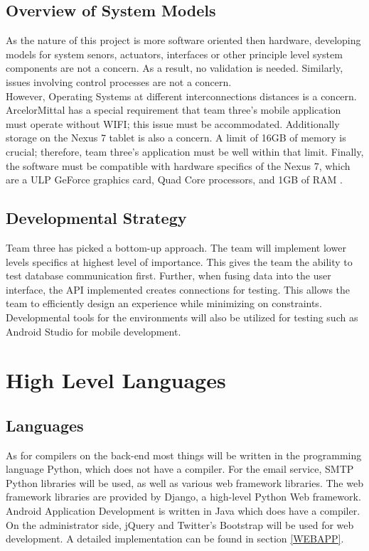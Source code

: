 \documentclass[Letter,11pt]{article}
\begin{document}
	\subsection{Overview of System Models}
	As the nature of this project is more software oriented then hardware, developing models for system senors, actuators, interfaces or other principle level system components are not a concern. As a result, no validation is needed. Similarly, issues involving control processes are not a concern. \\
	However, Operating Systems at different interconnections distances is a concern. ArcelorMittal has a special requirement that team three's mobile application must operate without WIFI; this issue must be accommodated. Additionally storage on the Nexus 7 tablet is also a concern. A limit of 16GB of memory is crucial; therefore, team three's application must be well within that limit.  Finally, the software must be compatible with hardware specifics of the Nexus 7, which are a ULP GeForce graphics card, Quad Core processors, and 1GB of RAM \cite{nexus7}. 
	\subsection{Developmental Strategy}
	Team three has picked a bottom-up approach. The team  will implement lower levels specifics at highest level of importance. This gives the team the ability to test database communication first. Further, when fusing data into the user interface, the API implemented creates connections for testing. This allows the team to efficiently design an experience while minimizing on constraints. Developmental tools for the environments will also be utilized for testing such as Android Studio for mobile development.
\section{High Level Languages}\label{highlevel}
	\subsection{Languages}
	As for compilers on the back-end most things will be written in the programming language Python, which does not have a compiler. For the email service, SMTP Python libraries will be used, as well as various web framework libraries. The web framework libraries are provided by Django, a high-level Python Web framework. \\
	Android Application Development is written in Java which does have a compiler. On the administrator side, jQuery and Twitter's Bootstrap will be used for web development. A detailed implementation can be found in section \ref{WEBAPP}. 
\end{document}
